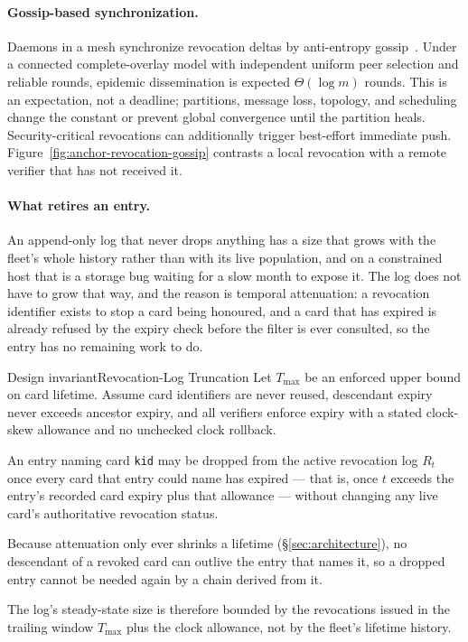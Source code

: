\documentclass[11pt,a4paper]{article}
\theoremstyle{definition}
\begin{document}
\paragraph{Gossip-based synchronization.} Daemons in a mesh synchronize revocation deltas by anti-entropy gossip~. Under a connected complete-overlay model with independent uniform peer selection and reliable rounds, epidemic dissemination is expected $\Theta(\log m)$ rounds. This is an expectation, not a deadline; partitions, message loss, topology, and scheduling change the constant or prevent global convergence until the partition heals. Security-critical revocations can additionally trigger best-effort immediate push. Figure~\ref{fig:anchor-revocation-gossip} contrasts a local revocation with a remote verifier that has not received it.



\paragraph{What retires an entry.} %
An append-only log that never drops anything has a
size that grows with the fleet's whole history rather than with its live population,
and on a constrained host that is a storage bug waiting for a slow month to expose
it. The log does not have to grow that way, and the reason is temporal attenuation: a
revocation identifier exists to stop a card being honoured, and a card that has
expired is already refused by the expiry check before the filter is ever consulted,
so the entry has no remaining work to do.

\begin{pdclaim}{Design invariant}{Revocation-Log Truncation}\label{def:revocation-truncation}
\setlength{\parskip}{4pt plus 1pt}
Let $T_{\max}$ be an enforced upper bound on card lifetime. Assume card identifiers
are never reused, descendant expiry never exceeds ancestor expiry, and all
verifiers enforce expiry with a stated clock-skew allowance and no unchecked
clock rollback.

An entry naming card \texttt{kid} may be dropped from the active
revocation log
$R_t$ once every card that entry could name has expired --- that is, once
$t$ exceeds the entry's recorded card expiry plus that allowance --- without
changing any live card's authoritative revocation status.

Because attenuation
only ever shrinks a lifetime (\S\ref{sec:architecture}), no descendant of a
revoked card can outlive the entry that names it, so a dropped entry cannot be
needed again by a chain derived from it.

The log's steady-state size is therefore
bounded by the revocations issued in the trailing window $T_{\max}$ plus the
clock allowance, not by the
fleet's lifetime history.
\end{pdclaim}
\end{document}
